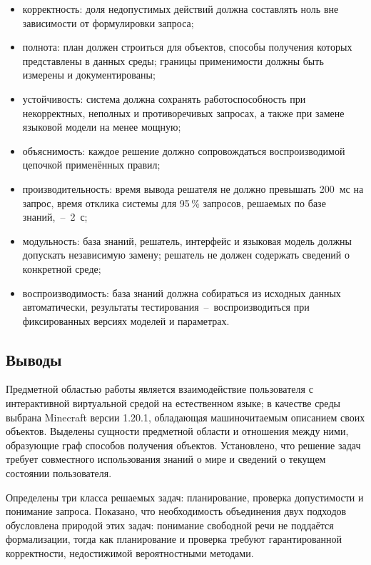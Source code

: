 \begin{itemize}
  \item корректность: доля недопустимых действий должна составлять ноль вне
        зависимости от формулировки запроса;
  \item полнота: план должен строиться для объектов, способы получения которых
        представлены в данных среды; границы применимости должны быть измерены
        и документированы;
  \item устойчивость: система должна сохранять работоспособность при некорректных,
        неполных и противоречивых запросах, а также при замене языковой модели
        на менее мощную;
  \item объяснимость: каждое решение должно сопровождаться воспроизводимой
        цепочкой применённых правил;
  \item производительность: время вывода решателя не должно превышать 200~мс на
        запрос, время отклика системы для 95\,\% запросов, решаемых по базе
        знаний,~--~2~с;
  \item модульность: база знаний, решатель, интерфейс и языковая модель должны
        допускать независимую замену; решатель не должен содержать сведений
        о конкретной среде;
  \item воспроизводимость: база знаний должна собираться из исходных данных
        автоматически, результаты тестирования~--~воспроизводиться при
        фиксированных версиях моделей и параметрах.
\end{itemize}

\subsection{Выводы}

Предметной областью работы является взаимодействие пользователя с интерактивной
виртуальной средой на естественном языке; в качестве среды выбрана Minecraft
версии 1.20.1, обладающая машиночитаемым описанием своих объектов. Выделены
сущности предметной области и отношения между ними, образующие граф способов
получения объектов. Установлено, что решение задач требует совместного
использования знаний о мире и сведений о текущем состоянии пользователя.

Определены три класса решаемых задач: планирование, проверка допустимости и
понимание запроса. Показано, что необходимость объединения двух подходов
обусловлена природой этих задач: понимание свободной речи не поддаётся
формализации, тогда как планирование и проверка требуют гарантированной
корректности, недостижимой вероятностными методами.

